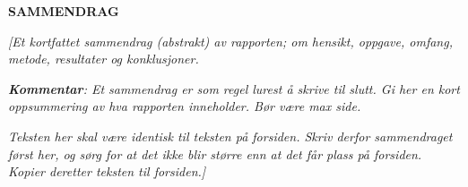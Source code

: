 \documentclass[../main.tex]{subfiles}
\begin{document}
{\bfseries \Large SAMMENDRAG}

\bigskip

{\itshape\color{blue}
[Et kortfattet sammendrag (abstrakt) av rapporten; om hensikt, oppgave, omfang, metode, resultater og konklusjoner.}

{\itshape\color{blue}
\textbf{Kommentar}: Et sammendrag er som regel lurest {\aa} skrive til slutt. Gi her en kort oppsummering av hva
rapporten inneholder. B{\o}r v{\ae}re max {\textonehalf} side.}

{\itshape\color{blue}
Teksten her skal v{\ae}re identisk til teksten p{\aa} forsiden. Skriv derfor sammendraget f{\o}rst her, og s{\o}rg for
at det ikke blir st{\o}rre enn at det f{\aa}r plass p{\aa} forsiden. Kopier deretter teksten til forsiden.]}


\bigskip
\end{document}
